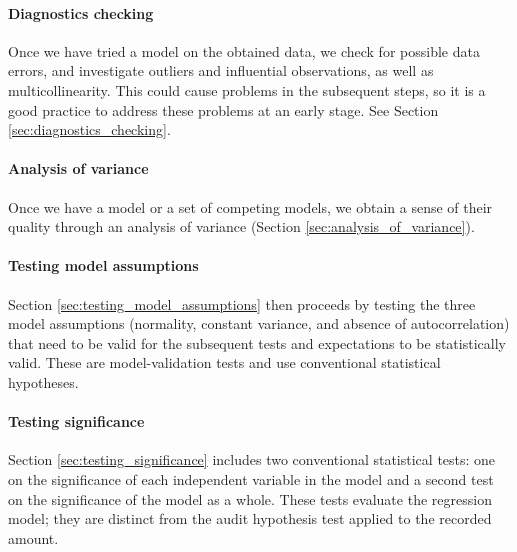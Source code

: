 
\paragraph{Diagnostics checking} %
\label{par:diagnostics_checking}

Once we have tried a model on the obtained data, we check for possible data errors, and investigate outliers and influential observations, as well as multicollinearity. This could cause problems in the subsequent steps, so it is a good practice to address these problems at an early stage. See Section \ref{sec:diagnostics_checking}.


\paragraph{Analysis of variance} %
\label{par:analysis_of_variance}

Once we have a model or a set of competing models, we obtain a sense of their quality through an analysis of variance (Section \ref{sec:analysis_of_variance}).


\paragraph{Testing model assumptions} %
\label{par:testing_model_assumptions}

Section \ref{sec:testing_model_assumptions} then proceeds by testing the three model assumptions (normality, constant variance, and absence of autocorrelation) that need to be valid for the subsequent tests and expectations to be statistically valid. These are model-validation tests and use conventional statistical hypotheses.


\paragraph{Testing significance} %
\label{par:testing_significance}

Section \ref{sec:testing_significance} includes two conventional statistical tests: one on the significance of each independent variable in the model and a second test on the significance of the model as a whole. These tests evaluate the regression model; they are distinct from the audit hypothesis test applied to the recorded amount.

